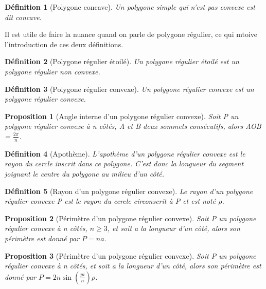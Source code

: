 \documentclass{book}
\newtheorem{definition}{Définition}
\newtheorem{proposition}{Proposition}
\begin{document}
\begin{appendices}
\begin{definition}[Polygone concave]
Un polygone simple qui n'est pas convexe est dit concave.
\end{definition}

Il est utile de faire la nuance quand on parle de polygone régulier, ce qui mtoive l'introduction de ces deux définitions.

\begin{definition}[Polygone régulier étoilé]
Un polygone régulier étoilé est un polygone régulier non convexe.
\end{definition}

\begin{definition}[Polygone régulier convexe]
Un polygone régulier convexe est un polygone régulier convexe.
\end{definition}

\begin{tcolorbox}[colback=red!6]
\begin{proposition}[Angle interne d'un polygone régulier convexe]
Soit P un polygone régulier convexe à n côtés, A et B deux sommets consécutifs, alors AOB = $\frac{2 \pi}{n}$.
\end{proposition}
\end{tcolorbox}

\begin{definition}[Apothème]
L'apothème d'un polygone régulier convexe est le rayon du cercle inscrit dans ce polygone. C'est donc la longueur du segment joignant le centre du polygone au milieu d'un côté.
\end{definition}

\begin{definition}[Rayon d'un polygone régulier convexe]
Le rayon d'un polygone régulier convexe P est le rayon du cercle circonscrit à P et est noté $\rho$.
\end{definition}

\begin{tcolorbox}[colback=red!6]
\begin{proposition}[Périmètre d'un polygone régulier convexe]
Soit P un polygone régulier convexe à n côtés, $n \geq 3$, et soit a la longueur d'un côté, alors son périmètre est donné par $P = na$.
\end{proposition}
\end{tcolorbox}

\begin{tcolorbox}[colback=red!6]
\begin{proposition}[Périmètre d'un polygone régulier convexe]
Soit P un polygone régulier convexe à n côtés, et soit a la longueur d'un côté, alors son périmètre est donné par $P = 2n\sin(\frac{pi}{n}) \rho$.
\end{proposition}
\end{tcolorbox}


\end{appendices}
\end{document}
